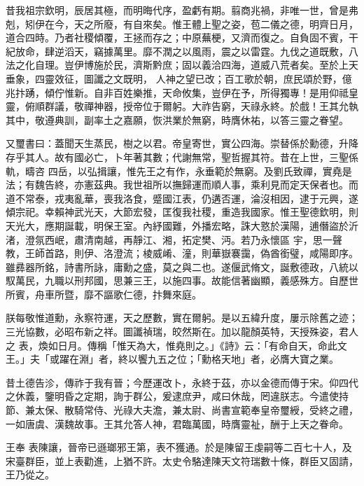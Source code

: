 \begin{pinyinscope}
 昔我祖宗欽明，辰居其極，而明晦代序，盈虧有期。翦商兆禍，非唯一世，曾是弗剋，矧伊在今，天之所廢，有自來矣。惟王體上聖之姿，苞二儀之德，明齊日月，道合四時。乃者社稷傾覆，王拯而存之；中原蕪梗，又濟而復之。自負固不賓，干紀放命，肆逆滔天，竊據萬里。靡不潤之以風雨，震之以雷霆。九伐之道既敷，八法之化自理。豈伊博施於民，濟斯黔庶；固以義洽四海，道威八荒者矣。至於上天垂象，四靈效征，圖讖之文既明，
 人神之望已改；百工歌於朝，庶民頌於野，億兆抃踴，傾佇惟新。自非百姓樂推，天命攸集，豈伊在予，所得獨專！是用仰祗皇靈，俯順群議，敬禪神器，授帝位于爾躬。大祚告窮，天祿永終。於戲！王其允執其中，敬遵典訓，副率土之嘉願，恢洪業於無窮，時膺休祐，以答三靈之眷望。



 又璽書曰：蓋聞天生蒸民，樹之以君。帝皇寄世，實公四海。崇替係於勳德，升降存乎其人。故有國必亡，卜年著其數；代謝無常，聖哲握其符。昔在上世，三聖係軌，疇咨
 四岳，以弘揖讓，惟先王之有作，永垂範於無窮。及劉氏致禪，實堯是法；有魏告終，亦憲茲典。我世祖所以撫歸運而順人事，乘利見而定天保者也。而道不常泰，戎夷亂華，喪我洛食，蹙國江表，仍遘否運，淪沒相因，逮于元興，遂傾宗祀。幸賴神武光天，大節宏發，匡復我社稷，重造我國家。惟王聖德欽明，則天光大，應期誕載，明保王室。內紓國難，外播宏略，誅大憝於漢陽，逋僭盜於沂渚，澄氛西岷，肅清南越，再靜江、湘，拓定樊、沔。若乃永懷區
 宇，思一聲教，王師首路，則伊、洛澄流；棱威崤、潼，則華嶽褰靄，偽酋銜璧，咸陽即序。雖彞器所銘，詩書所詠，庸勳之盛，莫之與二也。遂偃武脩文，誕敷德政，八統以馭萬民，九職以刑邦國，思兼三王，以施四事。故能信著幽顯，義感殊方。自歷世所賓，舟車所暨，靡不謳歌仁德，抃舞來庭。



 朕每敬惟道勳，永察符運，天之歷數，實在爾躬。是以五緯升度，屢示除舊之迹；三光協數，必昭布新之祥。圖讖禎瑞，皎然斯在。加以龍顏英特，天授殊姿，君人之
 表，煥如日月。傳稱「惟天為大，惟堯則之。」《詩》云：「有命自天，命此文王。」夫「或躍在淵」者，終以饗九五之位；「勳格天地」者，必膺大寶之業。



 昔土德告沴，傳祚于我有晉；今歷運改卜，永終于茲，亦以金德而傳于宋。仰四代之休義，鑒明昏之定期，詢于群公，爰逮庶尹，咸曰休哉，罔違朕志。今遣使持節、兼太保、散騎常侍、光祿大夫澹，兼太尉、尚書宣範奉皇帝璽綬，受終之禮，一如唐虞、漢魏故事。王其允答人神，君臨萬國，時膺靈祉，酬于上天之眷命。



 王奉
 表陳讓，晉帝已遜瑯邪王第，表不獲通。於是陳留王虔嗣等二百七十人，及宋臺群臣，並上表勸進，上猶不許。太史令駱達陳天文符瑞數十條，群臣又固請，王乃從之。






\end{pinyinscope}
